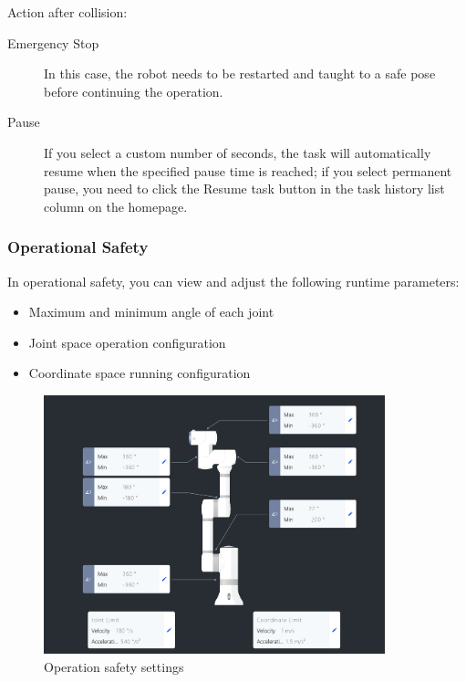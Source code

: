 Action after collision:
\begin{description}%
	\item[Emergency Stop] In this case, the robot needs to be restarted and taught to a safe pose before continuing the operation.
	\item[Pause] If you select a custom number of seconds, the task will automatically resume when the specified pause time is reached; if you select permanent pause, you need to click the Resume task button  in the task history list column on the homepage.
\end{description}


\subsubsection{Operational Safety}
\label{sec:运行安全}
In operational safety, you can view and adjust the following runtime parameters:
\begin{itemize}
	\item Maximum and minimum angle of each joint
	\item Joint space operation configuration
	\item Coordinate space running configuration
\end{itemize}



\begin{figure}[htb!]
	\centering
	\includegraphics[height=7.5cm]{en/image/safe.png}
	\caption{Operation safety settings}
	\label{fig:运行安全设置}
\end{figure}

